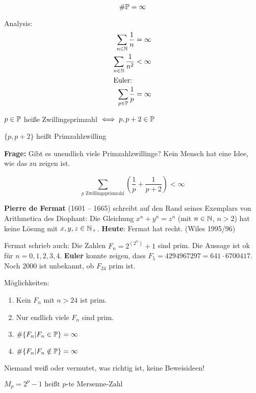 \documentclass[a4paper,twoside,DIV15,BCOR12mm]{scrbook}
\begin{document}
\begin{satz}
\[ \#\mathbb{P} = \infty \]
\end{satz}

\begin{bemerkung}
Analysis:
\begin{align*}
\sum_{n\in\mathbb{N}} \frac{1}{n} &= \infty \\
\sum_{n\in\mathbb{N}} \frac{1}{n^2} &< \infty \\
\intertext{Euler:} \sum_{p\in\mathbb{P}} \frac{1}{p}  &= \infty
\end{align*}
\end{bemerkung}

\begin{definition}
$p\in\mathbb{P}$ heiße Zwillingsprimzahl $\iff p, p+2 \in \mathbb{P}$

$\{p,p+2\}$ heißt Primzahlzwilling
\end{definition}

\textbf{Frage:} Gibt es unendlich viele Primzahlzwillinge? Kein
Mensch hat eine Idee, wie das zu zeigen ist.

\begin{satz}
\[ \sum_{p \text{ Zwillingsprimzahl}} \left(\frac1p + \frac 1 {p+2}\right) < \infty \]
\end{satz}

\textbf{Pierre de Fermat} (1601 -- 1665) schreibt auf den Rand
seines Exemplars von Arithmetica des Diophant: \glqq Die Gleichung
$x^n+y^n=z^n$ (mit $n\in\mathbb{N}$, $n>2$) hat keine Lösung mit $x,y,z
\in \mathbb{N}_+$\grqq. \textbf{Heute}: Fermat hat recht. (Wiles 1995/96)

Fermat schrieb auch: Die Zahlen $F_n = 2^{(2^n)}+1$ sind prim. Die
Aussage ist ok für $n=0,1,2,3,4$. \textbf{Euler} konnte zeigen, dass
$F_5  = 4294967297 = 641 \cdot 6700417$. Noch 2000 ist unbekannt, ob
$F_{24}$ prim ist.

Möglichkeiten:
\begin{enumerate}
\item Kein $F_n$ mit $n>24$ ist prim.
\item Nur endlich viele $F_n$ sind prim.
\item $\#\{F_n|F_n\in \mathbb{P}\} = \infty$
\item $\#\{F_n|F_n\notin \mathbb{P}\} = \infty$
\end{enumerate}
Niemand weiß oder vermutet, was richtig ist, keine Beweisideen!

\begin{definition}
$M_p = 2^p - 1 \text{ heißt $p$-te Mersenne-Zahl}$
\end{definition}
\end{document}
